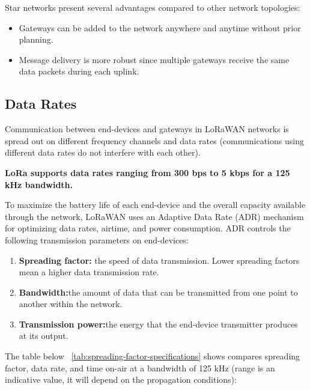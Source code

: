 Star networks present several advantages compared to other network topologies:

\begin{itemize}
	\item Gateways can be added to the network anywhere and anytime without prior planning.
	\item Message delivery is more robust since multiple gateways receive the same data packets during each uplink. \cite{ArduinoLoRaWAN101:2024}
\end{itemize}

\subsection{Data Rates}

Communication between end-devices and gateways in LoRaWAN networks is spread out on different frequency channels and data rates (communications using different data rates do not interfere with each other).

\textbf{LoRa supports data rates ranging from 300 bps to 5 kbps for a 125 kHz bandwidth.}
\newline

To maximize the battery life of each end-device and the overall capacity available through the network, LoRaWAN uses an Adaptive Data Rate (ADR) mechanism for optimizing data rates, airtime, and power consumption. ADR controls the following transmission parameters on end-devices: \cite{ArduinoLoRaWAN101:2024}

\begin{enumerate}
	\item \textbf{Spreading factor:} the speed of data transmission. Lower spreading factors mean a higher data transmission rate.
	\item \textbf{Bandwidth:}the amount of data that can be transmitted from one point to another within the network.
	\item \textbf{Transmission power:}the energy that the end-device transmitter produces at its output. \cite{ArduinoLoRaWAN101:2024}
\end{enumerate}

The table below ~\ref{tab:spreading-factor-specifications} shows compares spreading factor, data rate, and time on-air at a bandwidth of 125 kHz (range is an indicative value, it will depend on the propagation conditions):

